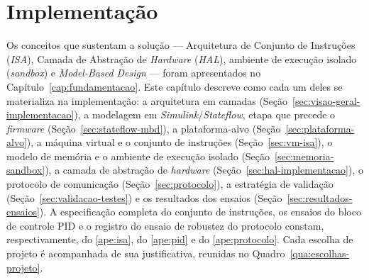 \chapter{Implementação}
\label{cap:implementacao}

Os conceitos que sustentam a solução --- Arquitetura de Conjunto de Instruções (\textit{ISA}), Camada de Abstração de \textit{Hardware} (\textit{HAL}), ambiente de execução isolado (\textit{sandbox}) e \textit{Model-Based Design} --- foram apresentados no Capítulo~\ref{cap:fundamentacao}.
Este capítulo descreve como cada um deles se materializa na implementação: a arquitetura em camadas (Seção~\ref{sec:visao-geral-implementacao}), a modelagem em \textit{Simulink}/\textit{Stateflow}, etapa que precede o \textit{firmware} (Seção~\ref{sec:stateflow-mbd}), a plataforma-alvo (Seção~\ref{sec:plataforma-alvo}), a máquina virtual e o conjunto de instruções (Seção~\ref{sec:vm-isa}), o modelo de memória e o ambiente de execução isolado (Seção~\ref{sec:memoria-sandbox}), a camada de abstração de \textit{hardware} (Seção~\ref{sec:hal-implementacao}), o protocolo de comunicação (Seção~\ref{sec:protocolo}), a estratégia de validação (Seção~\ref{sec:validacao-testes}) e os resultados dos ensaios (Seção~\ref{sec:resultados-ensaios}).
A especificação completa do conjunto de instruções, os ensaios do bloco de controle PID e o registro do ensaio de robustez do protocolo constam, respectivamente, do \ref{ape:isa}, do \ref{ape:pid} e do \ref{ape:protocolo}.
Cada escolha de projeto é acompanhada de sua justificativa, reunidas no Quadro~\ref{qua:escolhas-projeto}.


\newenvironment{figurafixa}{\par\vspace{\textfloatsep}\noindent\begin{minipage}{\textwidth}\centering}{\end{minipage}\par\vspace{\textfloatsep}}
\newenvironment{quadrofixo}{\begin{figurafixa}}{\end{figurafixa}}
\newenvironment{tabelafixa}{\begin{figurafixa}}{\end{figurafixa}}

